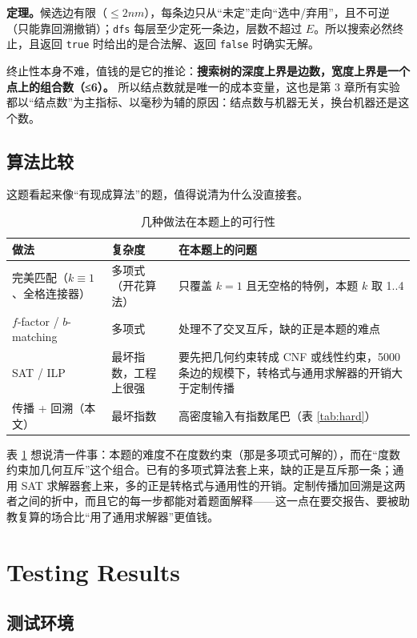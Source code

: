\documentclass[12pt,a4paper,fontset=windows]{ctexart}
\newcommand{\code}[1]{\texttt{#1}}
\begin{document}
\textbf{定理。}候选边有限（$\le 2nm$），每条边只从“未定”走向“选中/弃用”，且不可逆（只能靠回溯撤销）；\code{dfs} 每层至少定死一条边，层数不超过 $E$。所以搜索必然终止，且返回 \code{true} 时给出的是合法解、返回 \code{false} 时确实无解。

终止性本身不难，值钱的是它的推论：\textbf{搜索树的深度上界是边数，宽度上界是一个点上的组合数（≤6）。} 所以结点数就是唯一的成本变量，这也是第 3 章所有实验都以“结点数”为主指标、以毫秒为辅的原因：结点数与机器无关，换台机器还是这个数。

\subsection{算法比较}

这题看起来像“有现成算法”的题，值得说清为什么没直接套。

\begin{table}[htbp]
\centering
\caption{几种做法在本题上的可行性}
\label{tab:alt}
\small
\begin{tabular}{p{3.4cm}p{4.2cm}p{6.6cm}}
\toprule
\rowcolor{gray!12}做法 & 复杂度 & 在本题上的问题 \\
\midrule
完美匹配（$k\equiv1$、全格连接器） & 多项式（开花算法） & 只覆盖 $k=1$ 且无空格的特例，本题 $k$ 取 1..4 \\
$f$-factor / $b$-matching & 多项式 & 处理不了交叉互斥，缺的正是本题的难点 \\
SAT / ILP & 最坏指数，工程上很强 & 要先把几何约束转成 CNF 或线性约束，5000 条边的规模下，转格式与通用求解器的开销大于定制传播 \\
传播 + 回溯（本文） & 最坏指数 & 高密度输入有指数尾巴（表 \ref{tab:hard}） \\
\bottomrule
\end{tabular}
\end{table}

表 \ref{tab:alt} 想说清一件事：本题的难度不在度数约束（那是多项式可解的），而在“度数约束加几何互斥”这个组合。已有的多项式算法套上来，缺的正是互斥那一条；通用 SAT 求解器套上来，多的正是转格式与通用性的开销。定制传播加回溯是这两者之间的折中，而且它的每一步都能对着题面解释——这一点在要交报告、要被助教复算的场合比“用了通用求解器”更值钱。

\section{Testing Results}

\subsection{测试环境}
\end{document}
